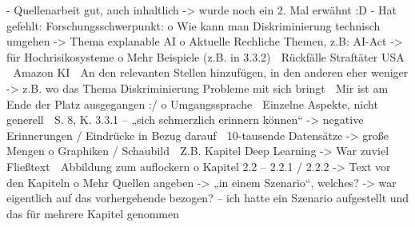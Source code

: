 -	Quellenarbeit gut, auch inhaltlich
-> wurde noch ein 2. Mal erwähnt :D
-	Hat gefehlt: Forschungsschwerpunkt:
o	Wie kann man Diskriminierung technisch umgehen
-> Thema explanable AI
o	Aktuelle Rechliche Themen, z.B: AI-Act
-> für Hochrisikosysteme
o	Mehr Beispiele (z.B. in 3.3.2)
	Rückfälle Straftäter USA
	Amazon KI
	An den relevanten  Stellen hinzufügen, in den anderen eher weniger
-> z.B. wo das Thema Diskriminierung Probleme mit sich bringt
	Mir ist am Ende der Platz ausgegangen :/
o	Umgangssprache
	Einzelne Aspekte, nicht generell
	S. 8, K. 3.3.1 – „sich schmerzlich erinnern können“
-> negative Erinnerungen / Eindrücke in Bezug darauf
	10-tausende Datensätze
-> große Mengen
o	Graphiken / Schaubild
	Z.B. Kapitel Deep Learning
-> War zuviel Fließtext
	Abbildung zum auflockern
o	Kapitel 2.2 – 2.2.1 / 2.2.2
-> Text vor den Kapiteln
o	Mehr Quellen angeben
-> „in einem Szenario“, welches?
-> war eigentlich auf das vorhergehende bezogen? – ich hatte ein Szenario aufgestellt und das für mehrere Kapitel genommen
